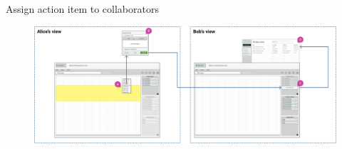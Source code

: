 \documentclass[aspectratio=169]{beamer}
\makeatletter
\newenvironment{restoretext}%
    {\@parboxrestore%
     \begin{adjustwidth}{-8mm}{-8mm}%
                \begin{lrbox}{\restorebox}%
                \begin{minipage}{\linewidth}%
    }{\end{minipage}\end{lrbox}
        \usebox\restorebox
        \end{adjustwidth}
     }
\makeatother
\begin{document}
\begin{frame}{Assign action item to collaborators}
    \vspace{2em}
    \begin{restoretext}
    \begin{figure}[h]
        \centering
        \includegraphics[width=1\textwidth]{images/assign-action-item.png}
    \end{figure}
\end{restoretext}
\end{frame}
\end{document}
